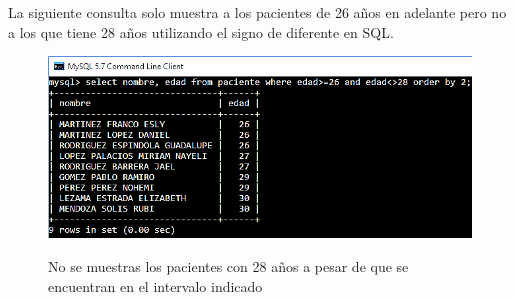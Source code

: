 \documentclass[12pt, titlepage]{article}
\begin{document}
	La siguiente consulta solo muestra a los pacientes de 26 años en adelante pero no a los que tiene 28 años utilizando el signo de diferente en SQL.
	\begin{figure}[H]
		\begin{center}
			\includegraphics[width=\textwidth]{img/once.png}
			\label{fig:once}
			\caption{No se muestras los pacientes con 28 años a pesar de que se encuentran en el intervalo indicado}
		\end{center}
	\end{figure}
	
\end{document}
